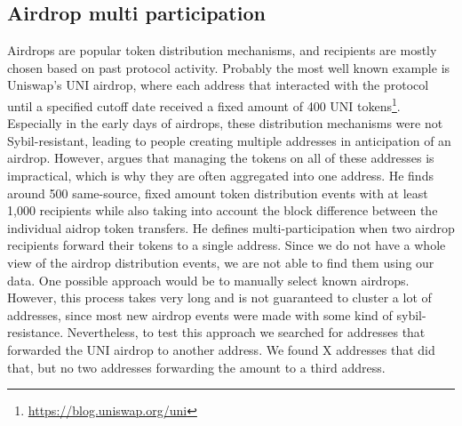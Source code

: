 \documentclass[12pt,a4paper,titlepage,oneside,english]{article}
\begin{document}
\subsection{Airdrop multi participation}
Airdrops are popular token distribution mechanisms, and recipients are mostly chosen based on past protocol activity. Probably the most well known example is Uniswap's UNI airdrop, where each address that interacted with the protocol until a specified cutoff date received a fixed amount of 400 UNI tokens\footnote{\url{https://blog.uniswap.org/uni}}. Especially in the early days of airdrops, these distribution mechanisms were not Sybil-resistant, leading to people creating multiple addresses in anticipation of an airdrop. However, \cite{FV:17} argues that managing the tokens on all of these addresses is impractical, which is why they are often aggregated into one address. He finds around 500 same-source, fixed amount token distribution events with at least 1,000 recipients while also taking into account the block difference between the individual aidrop token transfers. He defines multi-participation when two airdrop recipients forward their tokens to a single address. Since we do not have a whole view of the airdrop distribution events, we are not able to find them using our data. One possible approach would be to manually select known airdrops. However, this process takes very long and is not guaranteed to cluster a lot of addresses, since most new airdrop events were made with some kind of sybil-resistance. Nevertheless, to test this approach we searched for addresses that forwarded the UNI airdrop to another address. We found X addresses that did that, but no two addresses forwarding the amount to a third address.

\iffalse
Airdrops are a popular mechanism to distribute tokens. On the Ethereum blockchain, they are performed through smart contracts. The owners of the smart contract choose recipients either based on past activity, or ask users to sign up through online forms. Some of these registration processes require users to perform certain actions on social media, such as posting articles or following users. The amount of tokens given to each user is either fixed, or based on existing account balances. If the amount is fixed, there is an incentive to cheat the system. 
We identify Airdrops where a fixed number of tokens is distributed to many recipients. Then we search for addresses that have been forwarded the same amount from the initial recipients. 
This heuristic depends on two inputs. First, a set of aidrops with equal mounts, characterized by a signature of a distributing address, a token network and an amount. Second, the minimum nuber of token aggregations into a single address. The second parameter is trivial to choose, as multi-participation in its smallest form consist of two aidrop recipient addresses forwarding their tokens to a third adddress. In this case, a single entity would be in control of at least 3 addresses.
The main challenge lies in identying airdrops. To do so, we first examine all same-source, fixed amount token distributions.
\fi
\end{document}
